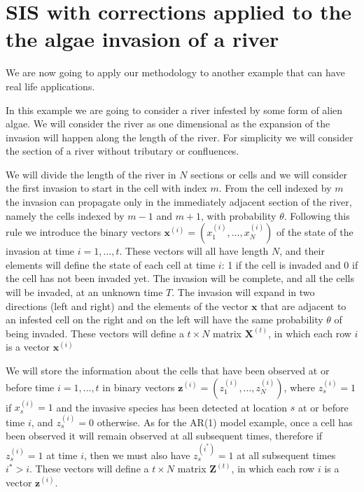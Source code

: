 \documentclass[11pt,a4paper]{article}
\renewcommand{\vec}[1]{\mathbf{#1}}
\begin{document}
\section{SIS with corrections applied to the the algae invasion of a river}

We are now going to apply our methodology to another example that can have real life applications. 

In this example we are going to consider a river infested by some form of alien algae. We will consider the river as one dimensional as the expansion of the invasion will happen along the length of the river. For simplicity we will consider the section of a river without tributary or confluences. 

We will divide the length of the river in $N$ sections or cells and we will consider the first invasion to start in the cell with index $m$.
From the cell indexed by $m$ the invasion can propagate only in the immediately adjacent section of the river, namely the cells indexed by $m-1$ and $m+1$, with probability $\theta$. Following this rule we introduce the binary vectors $\vec{x}^{(i)} = (x_1^{(i)}, \dots, x_{N}^{(i)})$ of the state of the invasion at time $i = 1, \dots, t$. These vectors will all have length $N$, and their elements will define the state of each cell at time $i$: 1 if the cell is invaded and 0 if the cell has not been invaded yet. The invasion will be complete, and all the cells will be invaded, at an unknown time $T$. 
The invasion will expand in two directions (left and right) and the elements of the vector $\vec{x}$ that are adjacent to an infested cell on the right and on the left will have the same probability $\theta$ of being invaded. These vectors will define a $t\times N$ matrix $\vec{X}^{(t)}$, in which each row $i$ is a vector $\vec{x}^{(i)}$

We will store the information about the cells that have been observed at or before time $i = 1, \dots, t$ in binary vectors $\vec{z}^{(i)} = (z_1^{(i)}, \dots, z_{N}^{(i)})$, where $z_s^{(i)} = 1$ if $x_s^{(i)} = 1$ and the invasive species has been detected at location $s$ at or before time $i$, and $z_s^{(i)} = 0$ otherwise. As for the AR(1) model example, once a cell has been observed it will remain observed at all subsequent times, therefore if $z_s^{(i)} = 1$ at time $i$, then we must also have $z_s^{(i^{*})} = 1$ at all subsequent times $i^{*} > i$. These vectors will define a $t \times N$ matrix $\vec{Z}^{(t)}$, in which each row $i$ is a vector $\vec{z}^{(i)}$.
\end{document}
